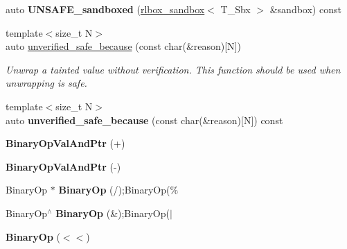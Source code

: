 \begin{DoxyCompactItemize}
\mbox{\label{classrlbox_1_1tainted__base__impl_a2fb81eab8dc3839f351d6d89410c2350}} 
auto {\bfseries U\+N\+S\+A\+F\+E\+\_\+sandboxed} (\hyperlink{classrlbox_1_1rlbox__sandbox}{rlbox\+\_\+sandbox}$<$ T\+\_\+\+Sbx $>$ \&sandbox) const
\item 
{\footnotesize template$<$size\+\_\+t N$>$ }\\auto \hyperlink{classrlbox_1_1tainted__base__impl_a1292132a467d30150be6d4e2b72ff6b2}{unverified\+\_\+safe\+\_\+because} (const char(\&reason)\mbox{[}N\mbox{]})
\begin{DoxyCompactList}\small\item\em Unwrap a tainted value without verification. This function should be used when unwrapping is safe. \end{DoxyCompactList}\item 
\mbox{\label{classrlbox_1_1tainted__base__impl_a88d4ea11a08ad91cb7ead1b80908f7f2}} 
{\footnotesize template$<$size\+\_\+t N$>$ }\\auto {\bfseries unverified\+\_\+safe\+\_\+because} (const char(\&reason)\mbox{[}N\mbox{]}) const
\item 
\mbox{\label{classrlbox_1_1tainted__base__impl_ac11254da0346088f7e2ccfdccf87deb1}} 
{\bfseries Binary\+Op\+Val\+And\+Ptr} (+)
\item 
\mbox{\label{classrlbox_1_1tainted__base__impl_ab64e73357c9a9387ca281d31e17bc490}} 
{\bfseries Binary\+Op\+Val\+And\+Ptr} (-\/)
\item 
\mbox{\label{classrlbox_1_1tainted__base__impl_af6fc3e13ab58feba9d6df1b9965055c0}} 
Binary\+Op $\ast$ {\bfseries Binary\+Op} (/);Binary\+Op(\%
\item 
\mbox{\label{classrlbox_1_1tainted__base__impl_a03f7e6cbb4ac6cc48b5f523c69863fee}} 
Binary\+Op$^\wedge$ {\bfseries Binary\+Op} (\&);Binary\+Op($\vert$
\item 
\mbox{\label{classrlbox_1_1tainted__base__impl_a100c45337a0ad48eb18ac977edb8cc48}} 
{\bfseries Binary\+Op} ($<$$<$)
\item 
$$
\end{DoxyCompactItemize}
